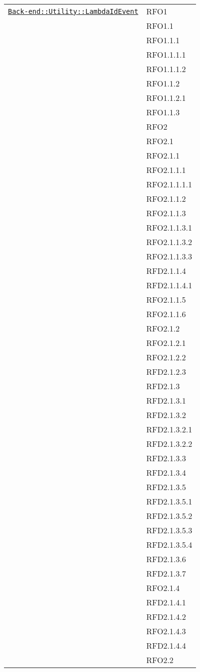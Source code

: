 \begin{longtable}{|>{\centering}m{10cm}|m{3cm}<{\centering}|}
\hyperref[Back-end::Utility::LambdaIdEvent]{\texttt{Back-end::Utility::LambdaIdEvent}} & RFO1\\
& RFO1.1\\
& RFO1.1.1\\
& RFO1.1.1.1\\
& RFO1.1.1.2\\
& RFO1.1.2\\
& RFO1.1.2.1\\
& RFO1.1.3\\
& RFO2\\
& RFO2.1\\
& RFO2.1.1\\
& RFO2.1.1.1\\
& RFO2.1.1.1.1\\
& RFO2.1.1.2\\
& RFO2.1.1.3\\
& RFO2.1.1.3.1\\
& RFO2.1.1.3.2\\
& RFO2.1.1.3.3\\
& RFD2.1.1.4\\
& RFD2.1.1.4.1\\
& RFO2.1.1.5\\
& RFO2.1.1.6\\
& RFO2.1.2\\
& RFO2.1.2.1\\
& RFO2.1.2.2\\
& RFD2.1.2.3\\
& RFD2.1.3\\
& RFD2.1.3.1\\
& RFD2.1.3.2\\
& RFD2.1.3.2.1\\
& RFD2.1.3.2.2\\
& RFD2.1.3.3\\
& RFD2.1.3.4\\
& RFD2.1.3.5\\
& RFD2.1.3.5.1\\
& RFD2.1.3.5.2\\
& RFD2.1.3.5.3\\
& RFD2.1.3.5.4\\
& RFD2.1.3.6\\
& RFD2.1.3.7\\
& RFO2.1.4\\
& RFD2.1.4.1\\
& RFD2.1.4.2\\
& RFO2.1.4.3\\
& RFD2.1.4.4\\
& RFO2.2\\

\end{longtable}
